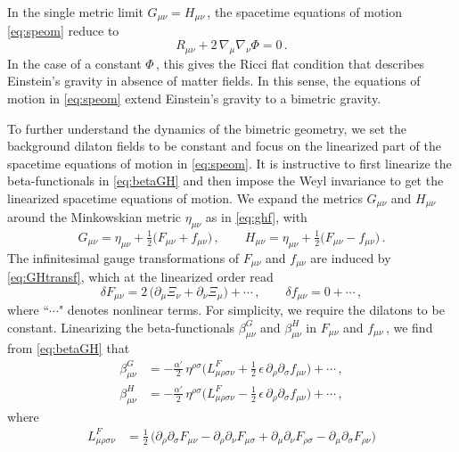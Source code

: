 \documentclass[11pt]{article}
\newcommand{\be}{\begin{equation}}
\newcommand{\ee}{\end{equation}}
\newcommand{\p}{\partial}
\begin{document}
In the single metric limit $G_{\mu\nu} \! = \!H_{\mu\nu}$\,, the spacetime equations of motion \eqref{eq:speom} reduce to
%
\be
	R_{\mu\nu} + 2 \, \nabla_{\!\mu} \nabla_{\!\nu} \Phi = 0\,.
\ee
%
In the case of a constant $\Phi$\,, this gives the Ricci flat condition that describes Einstein's gravity in absence of matter fields. In this sense, the equations of motion in \eqref{eq:speom} extend Einstein's gravity to a bimetric gravity. 

To further understand the dynamics of the bimetric geometry, we set the background dilaton fields to be constant and focus on the linearized part of the spacetime equations of motion in \eqref{eq:speom}. It is instructive to first linearize the beta-functionals in \eqref{eq:betaGH} and then impose the Weyl invariance to get the linearized spacetime equations of motion. 
We expand the metrics $G_{\mu\nu}$ and $H_{\mu\nu}$ around the Minkowskian metric $\eta_{\mu\nu}$ as in \eqref{eq:ghf}, with
%
\be
	G_{\mu\nu} = \eta_{\mu\nu} + \tfrac{1}{2} \bigl( F_{\mu\nu} + f_{\mu\nu} \bigr)\,,
		\qquad
	H_{\mu\nu} = \eta_{\mu\nu} + \tfrac{1}{2} \bigl( F_{\mu\nu} - f_{\mu\nu} \bigr)\,.
\ee
%
The infinitesimal gauge transformations of $F_{\mu\nu}$ and $f_{\mu\nu}$ are induced by \eqref{eq:GHtransf}, which at the linearized order read
%
\be \label{eq:deltaFf}
	\delta F_{\mu\nu} = 2 \, \bigl( \p_\mu \Xi_\nu + \p_\nu \Xi_\mu \bigr) + \cdots\,,
		\qquad
	\delta f_{\mu\nu} = 0 + \cdots\,,
\ee
%
where ``$\cdots$" denotes nonlinear terms.
For simplicity, we require the dilatons to be constant. Linearizing the beta-functionals $\beta^G_{\mu\nu}$ and $\beta^H_{\mu\nu}$ in $F_{\mu\nu}$ and $f_{\mu\nu}$\,, we find from \eqref{eq:betaGH} that
%
\begin{subequations} \label{eq:dgdh}
\begin{align}
	\beta^G_{\mu\nu} & = - \frac{\alpha'}{2} \, \eta^{\rho\sigma} \bigl( L^F_{\mu\rho\sigma\nu} 
	+ \tfrac{1}{2} \, \epsilon \, \p_\rho \p_\sigma f_{\mu\nu} \bigr) + \cdots \,, \\[2pt]
	\beta^H_{\mu\nu} & = - \frac{\alpha'}{2} \, \eta^{\rho\sigma} \bigl( L^F_{\mu\rho\sigma\nu} - \tfrac{1}{2} \, \epsilon \, \p_\rho \p_\sigma f_{\mu\nu} \bigr) + \cdots \,,
\end{align}
\end{subequations}
%
where 
%
\begin{subequations}
\begin{align}
	L^F_{\mu\rho\sigma\nu} & = \tfrac{1}{2} \, \bigl( \p_\rho \p_\sigma F_{\mu\nu} - \p_\rho \p_\nu F_{\mu\sigma} + \p_\mu \p_\nu F_{\rho\sigma} - \p_\mu \p_\sigma F_{\rho\nu} \bigr)
\end{align}
\end{subequations}
\end{document}
